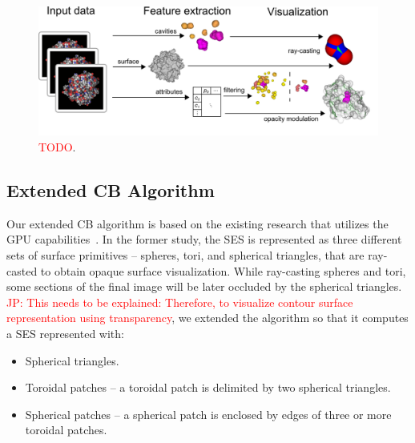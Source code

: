 \begin{figure}[htb]
  \centering
  \includegraphics[width=7.3in]{image/overview.png}
  \caption{\textcolor{red}{TODO}.}
	\label{fig:overview}
\end{figure}

\subsection{Extended CB Algorithm}
\label{sec:ecb}
Our extended CB algorithm is based on the existing research that utilizes the GPU capabilities~\cite{krone2011parallel}.
In the former study, the SES is represented as three different sets of surface primitives -- spheres, tori, and spherical triangles, that are ray-casted to obtain opaque surface visualization. 
While ray-casting spheres and tori, some sections of the final image will be later occluded by the spherical triangles.
\textcolor{red}{JP: This needs to be explained: Therefore, to visualize contour surface representation using transparency}, we extended the algorithm so that it computes a SES represented with:
\begin{itemize}
	\item Spherical triangles.
  \item Toroidal patches -- a toroidal patch is delimited by two spherical triangles.
	\item Spherical patches -- a spherical patch is enclosed by edges of three or more toroidal patches.
\end{itemize}

